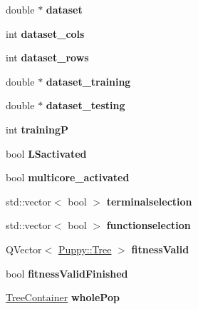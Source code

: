 \begin{DoxyCompactItemize}
\item 
\hypertarget{classWorker_a64bf5d8f1d9350b70d366e6a43c39fba}{}double $\ast$ {\bfseries dataset}\label{classWorker_a64bf5d8f1d9350b70d366e6a43c39fba}

\item 
\hypertarget{classWorker_a05ea9a7a069322b5cd3b80d7c955f1c0}{}int {\bfseries dataset\+\_\+cols}\label{classWorker_a05ea9a7a069322b5cd3b80d7c955f1c0}

\item 
\hypertarget{classWorker_acbe8642cda2ebfec7cedbd329892e9bf}{}int {\bfseries dataset\+\_\+rows}\label{classWorker_acbe8642cda2ebfec7cedbd329892e9bf}

\item 
\hypertarget{classWorker_aa832f7af255998292b58f2c6dfb6718e}{}double $\ast$ {\bfseries dataset\+\_\+training}\label{classWorker_aa832f7af255998292b58f2c6dfb6718e}

\item 
\hypertarget{classWorker_a4692da54491abf6c8119adae498aff57}{}double $\ast$ {\bfseries dataset\+\_\+testing}\label{classWorker_a4692da54491abf6c8119adae498aff57}

\item 
\hypertarget{classWorker_aa882edd61d31c3d15e6737f54f804f4a}{}int {\bfseries training\+P}\label{classWorker_aa882edd61d31c3d15e6737f54f804f4a}

\item 
\hypertarget{classWorker_a7dd1dfdc0a74074c82efa5f0d7c32a1e}{}bool {\bfseries L\+Sactivated}\label{classWorker_a7dd1dfdc0a74074c82efa5f0d7c32a1e}

\item 
\hypertarget{classWorker_a34fec1328c31ba6e844a9a93c8f7cae2}{}bool {\bfseries multicore\+\_\+activated}\label{classWorker_a34fec1328c31ba6e844a9a93c8f7cae2}

\item 
\hypertarget{classWorker_a70ec9cce22a12a9d582a3596fef6fbf4}{}std\+::vector$<$ bool $>$ {\bfseries terminalselection}\label{classWorker_a70ec9cce22a12a9d582a3596fef6fbf4}

\item 
\hypertarget{classWorker_a9dc8e869da4a241ee0bda2e10d2259e5}{}std\+::vector$<$ bool $>$ {\bfseries functionselection}\label{classWorker_a9dc8e869da4a241ee0bda2e10d2259e5}

\item 
\hypertarget{classWorker_a028b694c257b109a56a1fa11cc067cad}{}Q\+Vector$<$ \hyperlink{classPuppy_1_1Tree}{Puppy\+::\+Tree} $>$ {\bfseries fitness\+Valid}\label{classWorker_a028b694c257b109a56a1fa11cc067cad}

\item 
\hypertarget{classWorker_a63db29e69c7054d2084f3d51981a390e}{}bool {\bfseries fitness\+Valid\+Finished}\label{classWorker_a63db29e69c7054d2084f3d51981a390e}

\item 
\hypertarget{classWorker_a7ccf6daed284312665431edfb1378d53}{}\hyperlink{structWorker_1_1TreeContainer}{Tree\+Container} {\bfseries whole\+Pop}\label{classWorker_a7ccf6daed284312665431edfb1378d53}

\end{DoxyCompactItemize}


